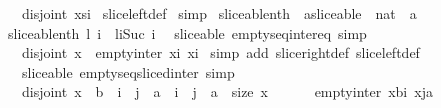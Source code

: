 \begin{isabellebody}
\ \ disjoint\ {\isacharparenleft}xs{\isasymdagger}i{\isachardot}{\isachardot}{\isacharparenright}{\isachardoublequoteclose}\isanewline
%
\isadelimproof
%
\endisadelimproof
%
\isatagproof
{}\isamarkupfalse%
\ slice{\isacharunderscore}left{\isacharunderscore}def\isanewline
{}\isamarkupfalse%
\ simp%
\endisatagproof
{\isafoldproof}%
%
\isadelimproof
\isanewline
%
\endisadelimproof
\isanewline
\isanewline
\isanewline
{}\isamarkupfalse%
\ sliceable{\isacharunderscore}nth\ {\isacharcolon}{\isacharcolon}\ {\isachardoublequoteopen}{\isacharprime}a{\isacharcolon}{\isacharcolon}sliceable\ {\isasymRightarrow}\ nat\ {\isasymRightarrow}\ {\isacharprime}a{\isachardoublequoteclose}\isanewline
{}\isanewline
{\isachardoublequoteopen}sliceable{\isacharunderscore}nth\ l\ i\ {\isasymequiv}\ l{\isasymdagger}i{\isachardot}{\isachardot}{\isacharparenleft}Suc\ i{\isacharparenright}{\isachardoublequoteclose}\isanewline
\isanewline
\isanewline
\isanewline
{}\isamarkupfalse%
\ {\isacharparenleft}\ sliceable{\isacharparenright}\ empty{\isacharunderscore}seq{\isacharunderscore}inter{\isacharunderscore}eq\ {\isacharbrackleft}simp{\isacharbrackright}{\isacharcolon}\ \isanewline
\ \ {\isachardoublequoteopen}disjoint\ x\ {\isasymLongrightarrow}\ empty{\isacharunderscore}inter\ {\isacharparenleft}x{\isasymdagger}{\isachardot}{\isachardot}i{\isacharparenright}\ {\isacharparenleft}x{\isasymdagger}i{\isachardot}{\isachardot}{\isacharparenright}{\isachardoublequoteclose}\isanewline
%
\isadelimproof
%
\endisadelimproof
%
\isatagproof
{}\isamarkupfalse%
\ {\isacharparenleft}simp\ add{\isacharcolon}\ slice{\isacharunderscore}right{\isacharunderscore}def\ slice{\isacharunderscore}left{\isacharunderscore}def{\isacharparenright}%
\endisatagproof
{\isafoldproof}%
%
\isadelimproof
\isanewline
%
\endisadelimproof
\isanewline
{}\isamarkupfalse%
\ {\isacharparenleft}\ sliceable{\isacharparenright}\ empty{\isacharunderscore}seq{\isacharunderscore}sliced{\isacharunderscore}inter\ {\isacharbrackleft}simp{\isacharbrackright}{\isacharcolon}\ \isanewline
\ \ {\isachardoublequoteopen}disjoint\ x\ {\isasymLongrightarrow}\ b\ {\isasymle}\ i\ {\isasymLongrightarrow}\ j\ {\isasymle}\ a\ {\isasymLongrightarrow}\ i\ {\isasymle}\ j\ {\isasymLongrightarrow}\ a\ {\isasymle}\ size\ x\ {\isasymLongrightarrow}\ \isanewline
\ \ \ \ empty{\isacharunderscore}inter\ {\isacharparenleft}x{\isasymdagger}b{\isachardot}{\isachardot}i{\isacharparenright}\ {\isacharparenleft}x{\isasymdagger}j{\isachardot}{\isachardot}a{\isacharparenright}{\isachardoublequoteclose}\isanewline

\end{isabellebody}
